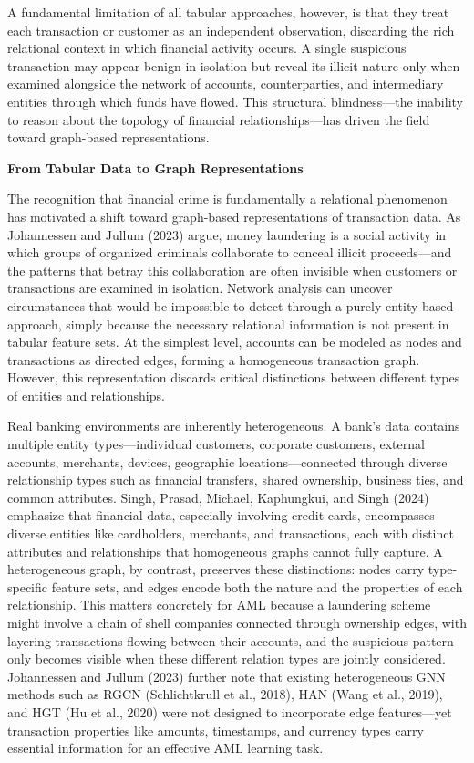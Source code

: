 \documentclass[12pt,a4paper]{article}
\begin{document}
A fundamental limitation of all tabular approaches, however, is that they treat each transaction or customer as an independent observation, discarding the rich relational context in which financial activity occurs. A single suspicious transaction may appear benign in isolation but reveal its illicit nature only when examined alongside the network of accounts, counterparties, and intermediary entities through which funds have flowed. This structural blindness---the inability to reason about the topology of financial relationships---has driven the field toward graph-based representations.

\bigskip
\noindent\textbf{From Tabular Data to Graph Representations}

\noindent The recognition that financial crime is fundamentally a relational phenomenon has motivated a shift toward graph-based representations of transaction data. As Johannessen and Jullum (2023) argue, money laundering is a social activity in which groups of organized criminals collaborate to conceal illicit proceeds---and the patterns that betray this collaboration are often invisible when customers or transactions are examined in isolation. Network analysis can uncover circumstances that would be impossible to detect through a purely entity-based approach, simply because the necessary relational information is not present in tabular feature sets. At the simplest level, accounts can be modeled as nodes and transactions as directed edges, forming a homogeneous transaction graph. However, this representation discards critical distinctions between different types of entities and relationships.

Real banking environments are inherently heterogeneous. A bank's data contains multiple entity types---individual customers, corporate customers, external accounts, merchants, devices, geographic locations---connected through diverse relationship types such as financial transfers, shared ownership, business ties, and common attributes. Singh, Prasad, Michael, Kaphungkui, and Singh (2024) emphasize that financial data, especially involving credit cards, encompasses diverse entities like cardholders, merchants, and transactions, each with distinct attributes and relationships that homogeneous graphs cannot fully capture. A heterogeneous graph, by contrast, preserves these distinctions: nodes carry type-specific feature sets, and edges encode both the nature and the properties of each relationship. This matters concretely for AML because a laundering scheme might involve a chain of shell companies connected through ownership edges, with layering transactions flowing between their accounts, and the suspicious pattern only becomes visible when these different relation types are jointly considered. Johannessen and Jullum (2023) further note that existing heterogeneous GNN methods such as RGCN (Schlichtkrull et al., 2018), HAN (Wang et al., 2019), and HGT (Hu et al., 2020) were not designed to incorporate edge features---yet transaction properties like amounts, timestamps, and currency types carry essential information for an effective AML learning task.
\end{document}
